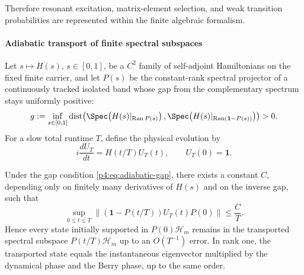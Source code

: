 \documentclass[12pt,a4paper]{article}
\begin{document}
Therefore resonant excitation, matrix-element selection, and weak transition probabilities are represented within the finite algebraic formalism.



\paragraph{Adiabatic transport of finite spectral subspaces}
\label{p4:sec:part2-adiabatic-transport}

Let \(s\mapsto H(s)\), \(s\in[0,1]\), be a \(C^2\) family of
self-adjoint Hamiltonians on the fixed finite carrier, and let \(P(s)\) be
the constant-rank spectral projector of a continuously tracked isolated
band whose gap from the complementary spectrum stays uniformly positive:
\begin{equation}
\label{p4:eq:adiabatic-gap}
g:=\inf_{s\in[0,1]}
\operatorname{dist}\!\left(
\Spec\!\left(H(s)|_{\operatorname{Ran}P(s)}\right),
\Spec\!\left(H(s)|_{\operatorname{Ran}(\mathbf1-P(s))}\right)
\right)>0.
\end{equation}
For a slow total runtime $T$, define the physical evolution by
\begin{equation}
\label{p4:eq:adiabatic-evolution}
i\frac{dU_T}{dt}=H(t/T)U_T(t),
\qquad
U_T(0)=\mathbf 1.
\end{equation}


\begin{theorem}
\label{p4:thm:finite-adiabatic}
Under the gap condition \eqref{p4:eq:adiabatic-gap}, there exists a constant $C$, depending only on finitely many derivatives of $H(s)$ and on the inverse gap, such that
\begin{equation}
\label{p4:eq:adiabatic-bound}
\sup_{0\le t\le T}
\bigl\|(\mathbf 1-P(t/T))U_T(t)P(0)\bigr\|
\le
\frac{C}{T}.
\end{equation}
Hence every state initially supported in $P(0)\mathcal H_m$ remains in the transported spectral subspace $P(t/T)\mathcal H_m$ up to an $O(T^{-1})$ error.
In rank one, the transported state equals the instantaneous eigenvector multiplied by the dynamical phase and the Berry phase, up to the same order.
\end{theorem}
\end{document}

